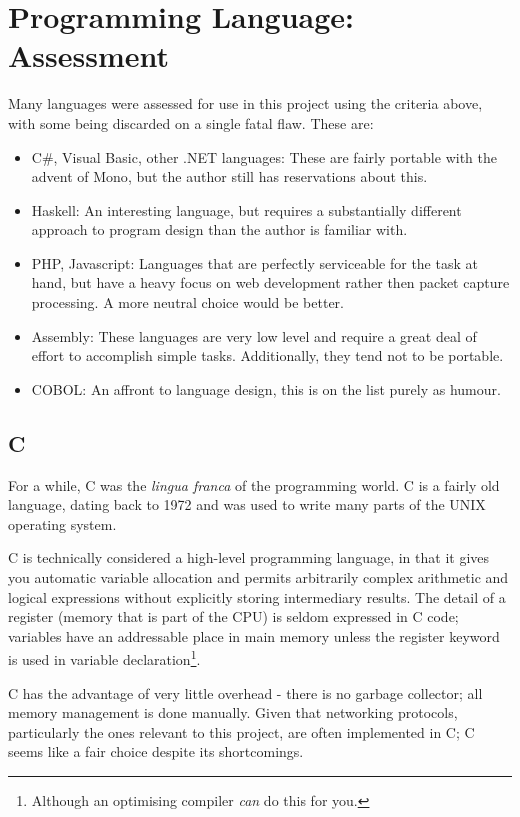 \documentclass[10pt,a4paper,notitlepage]{report}
\begin{document}
\section{Programming Language: Assessment}
Many languages were assessed for use in this project using the criteria above, with some being discarded on a single fatal flaw. These are:
\begin{itemize}
\item C\#, Visual Basic, other .NET languages: These are fairly portable with the advent of Mono\cite{mono}, but the author still has reservations about this.
\item Haskell: An interesting language, but requires a substantially different approach to program design than the author is familiar with.
\item PHP, Javascript: Languages that are perfectly serviceable for the task at hand, but have a heavy focus on web development rather then packet capture processing. A more neutral choice would be better.
\item Assembly: These languages are very low level and require a great deal of effort to accomplish simple tasks. Additionally, they tend not to be portable.
\item COBOL: An affront to language design, this is on the list purely as humour.
\end{itemize}

\subsection{C}
For a while, C was the \emph{lingua franca} of the programming world. C is a fairly old language, dating back to 1972 and was used to write many parts of the UNIX operating system\cite{tcpl}.

C is technically considered a high-level programming language, in that it gives you automatic variable allocation and permits arbitrarily complex arithmetic and logical expressions without explicitly storing intermediary results. The detail of a register (memory that is part of the CPU) is seldom expressed in C code; variables have an addressable place in main memory unless the register keyword is used in variable declaration\footnote{Although an optimising compiler \emph{can} do this for you.}.

C has the advantage of very little overhead - there is no garbage collector; all memory management is done manually. Given that networking protocols, particularly the ones relevant to this project, are often implemented in C; C seems like a fair choice despite its shortcomings.
\end{document}
